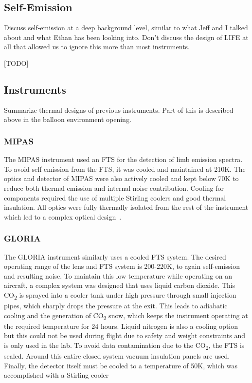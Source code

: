\subsection{Self-Emission}\label{self-emission}
Discuss self-emission at a deep background level, similar to what Jeff and I talked about and what Ethan has been looking into. Don't discuss the design of LIFE at all that allowed us to ignore this more than most instruments.

[TODO]

\subsection{Instruments} \label{GLORIA_MIPAS_thermal}
Summarize thermal designs of previous instruments. Part of this is described above in the balloon environment opening.

\subsubsection{MIPAS}
The MIPAS instrument used an FTS for the detection of limb emission spectra. To avoid self-emission from the FTS, it was cooled and maintained at 210K. The optics and detector of MIPAS were also actively cooled and kept below 70K to reduce both thermal emission and internal noise contribution. Cooling for components required the use of multiple Stirling coolers and good thermal insulation. All optics were fully thermally isolated from the rest of the instrument which led to a complex optical design~\citep{MIPAS_instrument}.

\subsubsection{GLORIA}
The GLORIA instrument similarly uses a cooled FTS system. The desired operating range of the lens and FTS system is 200-220K, to again self-emission and resulting noise. To maintain this low temperature while operating on an aircraft, a complex system was designed that uses liquid carbon dioxide. This CO\textsubscript{2} is sprayed into a cooler tank under high pressure through small injection pipes, which sharply drops the pressure at the exit. This leads to adiabatic cooling and the generation of CO\textsubscript{2} snow, which keeps the instrument operating at the required temperature for 24 hours. Liquid nitrogen is also a cooling option but this could not be used during flight due to safety and weight constraints and is only used in the lab. To avoid data contamination due to the CO\textsubscript{2}, the FTS is sealed. Around this entire closed system vacuum insulation panels are used. Finally, the detector itself must be cooled to a temperature of 50K, which was accomplished with a Stirling cooler~\citep{GLORIA_concept}~\citep{GLORIA_thermalmech}

